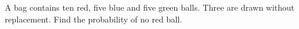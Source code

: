 A bag contains ten red, five blue and five green balls. Three are drawn without replacement. Find the probability of no red ball.
